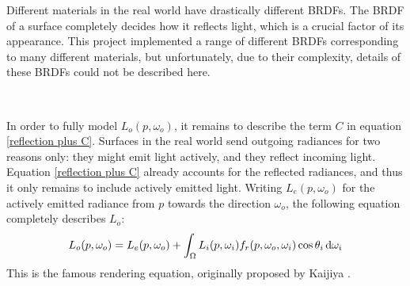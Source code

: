 Different materials in the real world have drastically different BRDFs. The BRDF of a surface completely decides how it reflects light, which is a crucial factor of its appearance. This project implemented a range of different BRDFs corresponding to many different materials, but unfortunately, due to their complexity, details of these BRDFs could not be described here. 

~

In order to fully model $L_o(p,\omega_o)$, it remains to describe the term $C$ in equation \ref{reflection plus C}. Surfaces in the real world send outgoing radiances for two reasons only: they might emit light actively, and they reflect incoming light. Equation \ref{reflection plus C} already accounts for the reflected radiances, and thus it only remains to include actively emitted light. Writing $L_e(p,\omega_o)$ for the actively emitted radiance from $p$ towards the direction $\omega_o$, the following equation completely describes $L_o$:
\begin{align}
    L_o(p,\omega_o) = L_e(p,\omega_o) + \int_\Omega L_i(p,\omega_i)f_r(p,\omega_o,\omega_i)\cos\theta_i\,\mathrm{d}\omega_i
    \label{rendering equation}
\end{align}
This is the famous rendering equation, originally proposed by Kaijiya \cite{rendering_equation}. 


